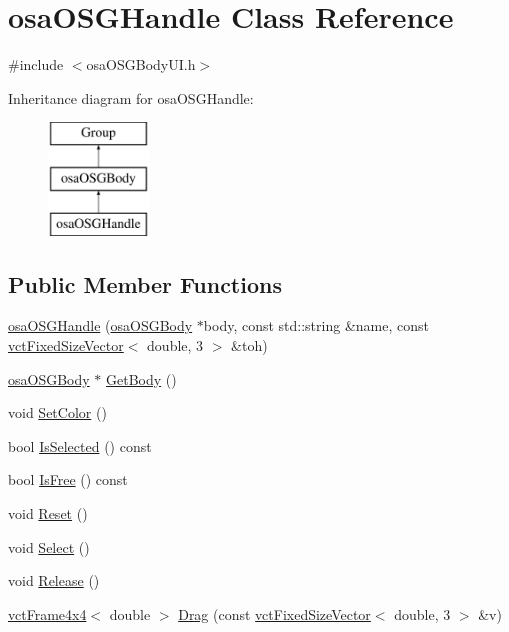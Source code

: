 \hypertarget{classosa_o_s_g_handle}{\section{osa\-O\-S\-G\-Handle Class Reference}
\label{classosa_o_s_g_handle}
}


{\ttfamily \#include $<$osa\-O\-S\-G\-Body\-U\-I.\-h$>$}

Inheritance diagram for osa\-O\-S\-G\-Handle\-:\begin{figure}[H]
\begin{center}
\leavevmode
\includegraphics[height=3.000000cm]{d4/d1b/classosa_o_s_g_handle}
\end{center}
\end{figure}
\subsection*{Public Member Functions}
\begin{DoxyCompactItemize}
\item 
\hyperlink{classosa_o_s_g_handle_a1c41a8a104297687d2379776a1700ba1}{osa\-O\-S\-G\-Handle} (\hyperlink{classosa_o_s_g_body}{osa\-O\-S\-G\-Body} $\ast$body, const std\-::string \&name, const \hyperlink{classvct_fixed_size_vector}{vct\-Fixed\-Size\-Vector}$<$ double, 3 $>$ \&toh)
\item 
\hyperlink{classosa_o_s_g_body}{osa\-O\-S\-G\-Body} $\ast$ \hyperlink{classosa_o_s_g_handle_a781738b3fcddd63662936ec005c66fba}{Get\-Body} ()
\item 
void \hyperlink{classosa_o_s_g_handle_ac9fce94aee665eec649ac5898358734e}{Set\-Color} ()
\item 
bool \hyperlink{classosa_o_s_g_handle_a2ffe950682a035236ca3b42869cc0079}{Is\-Selected} () const 
\item 
bool \hyperlink{classosa_o_s_g_handle_a347f22c18ac0dfb6740bd46555eeedd2}{Is\-Free} () const 
\item 
void \hyperlink{classosa_o_s_g_handle_a8be505212363f12340e82b36c5344ef6}{Reset} ()
\item 
void \hyperlink{classosa_o_s_g_handle_a2fa1176a53f33269298741146e960296}{Select} ()
\item 
void \hyperlink{classosa_o_s_g_handle_ad08ce5abb32e5582870402240ea5719d}{Release} ()
\item 
\hyperlink{classvct_frame4x4}{vct\-Frame4x4}$<$ double $>$ \hyperlink{classosa_o_s_g_handle_a11cdeccb1dc23536ab8447b736dfc6a3}{Drag} (const \hyperlink{classvct_fixed_size_vector}{vct\-Fixed\-Size\-Vector}$<$ double, 3 $>$ \&v)
\end{DoxyCompactItemize}
